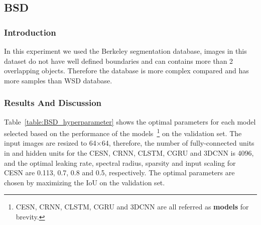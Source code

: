 \documentclass{WitsPhysicsReport}
\begin{document}

\subsection{BSD}
\label{sec:BSD}

\subsubsection{Introduction}
In this experiment we used the Berkeley segmentation database, images in this dataset do not have well defined boundaries and can contains more than 2 overlapping objects. Therefore the database is more complex compared and has more samples than WSD database.

\subsubsection{Results And Discussion}

Table~\ref{table:BSD_hyperparameter} shows the optimal parameters for each model selected based on the performance of the models~\footnote{CESN, CRNN, CLSTM, CGRU and 3DCNN are all referred as \textbf{models} for brevity.} on the validation set. The input images are resized to 64$\times$64, therefore, the number of fully-connected units in and hidden units for the CESN, CRNN, CLSTM, CGRU and 3DCNN is 4096, and the optimal leaking rate, spectral radius, sparsity and input scaling for CESN are 0.113, 0.7, 0.8 and 0.5, respectively. The optimal parameters are chosen by maximizing the IoU on the validation set.

\begin{table}[H]
    \centering
        \caption{BSD optimal parameters for the CESN, CRNN, CLSTM, CGRU and 3DCNN}
    \label{table:BSD_hyperparameter}
\end{table}
\end{document}
